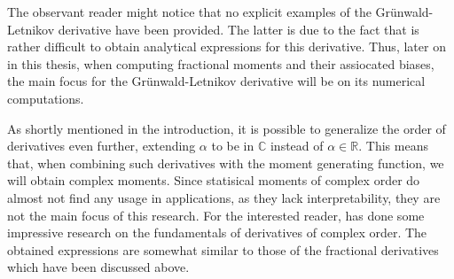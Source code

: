 The observant reader might notice that no explicit examples of the Grünwald-Letnikov derivative have been provided. The latter is due to the fact that is rather difficult to obtain analytical expressions for this derivative. Thus, later on in this thesis, when computing fractional moments and their assiocated biases, the main focus for the Grünwald-Letnikov derivative will be on its numerical computations.
\begin{remark}
    
As shortly mentioned in the introduction, it is possible to generalize the order of derivatives even further, extending \(\alpha\) to be in \(\mathbb{C}\) instead of \(\alpha \in \mathbb{R}\). This means that, when combining such derivatives with the moment generating function, we will obtain complex moments. Since statisical moments of complex order do almost not find any usage in applications, as they lack interpretability, they are not the main focus of this research. For the interested reader, \cite{love1971} has done some impressive research on the fundamentals of derivatives of complex order. The obtained expressions are somewhat similar to those of the fractional derivatives which have been discussed above.
\end{remark}